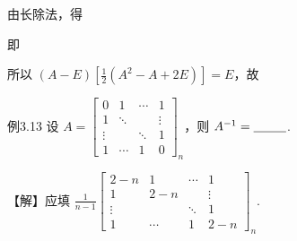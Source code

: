 由长除法，得



即


所以 $(A-E)\left[\frac{1}{2}(A^{2}-A+2E)\right]=E$，故


\begin{fcard}{例3.13}
设 $A=\begin{bmatrix}0&1&\cdots&1\\1&\ddots&&\vdots\\\vdots&&\ddots&1\\1&\cdots&1&0\end{bmatrix}_n$，则 $A^{-1}=\underline{\hspace{2.6em}}$.
\end{fcard}

【解】应填 $\frac{1}{n-1}\begin{bmatrix}2-n&1&\cdots&1\\1&2-n&&\vdots\\\vdots&&\ddots&1\\1&\cdots&1&2-n\end{bmatrix}_n$.


